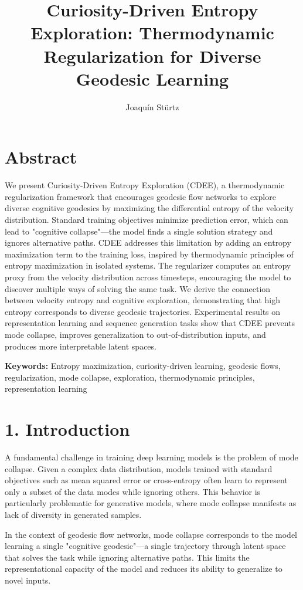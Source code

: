 \documentclass[12pt]{article}
\title{\textbf{Curiosity-Driven Entropy Exploration: Thermodynamic Regularization for Diverse Geodesic Learning}}
\author{Joaquín Stürtz}
\date{}
\begin{document}
\maketitle

\section*{Abstract}

We present Curiosity-Driven Entropy Exploration (CDEE), a thermodynamic regularization framework that encourages geodesic flow networks to explore diverse cognitive geodesics by maximizing the differential entropy of the velocity distribution. Standard training objectives minimize prediction error, which can lead to "cognitive collapse"—the model finds a single solution strategy and ignores alternative paths. CDEE addresses this limitation by adding an entropy maximization term to the training loss, inspired by thermodynamic principles of entropy maximization in isolated systems. The regularizer computes an entropy proxy from the velocity distribution across timesteps, encouraging the model to discover multiple ways of solving the same task. We derive the connection between velocity entropy and cognitive exploration, demonstrating that high entropy corresponds to diverse geodesic trajectories. Experimental results on representation learning and sequence generation tasks show that CDEE prevents mode collapse, improves generalization to out-of-distribution inputs, and produces more interpretable latent spaces.

\textbf{Keywords:} Entropy maximization, curiosity-driven learning, geodesic flows, regularization, mode collapse, exploration, thermodynamic principles, representation learning

\section{1. Introduction}

A fundamental challenge in training deep learning models is the problem of mode collapse. Given a complex data distribution, models trained with standard objectives such as mean squared error or cross-entropy often learn to represent only a subset of the data modes while ignoring others. This behavior is particularly problematic for generative models, where mode collapse manifests as lack of diversity in generated samples.

In the context of geodesic flow networks, mode collapse corresponds to the model learning a single "cognitive geodesic"—a single trajectory through latent space that solves the task while ignoring alternative paths. This limits the representational capacity of the model and reduces its ability to generalize to novel inputs.
\end{document}
